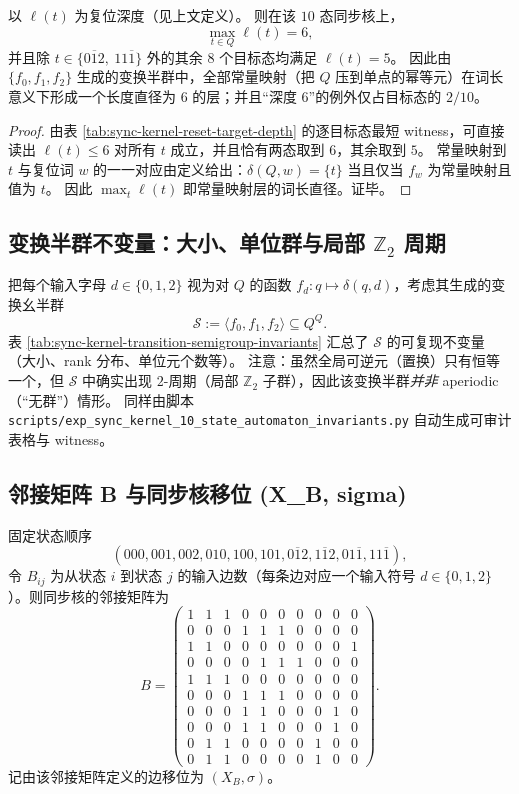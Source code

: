 

\begin{proposition}[复位深度谱的集中与常量映射理想的长度直径]\label{prop:sync10-reset-depth-diameter}
以 \(\ell(t)\) 为复位深度（见上文定义）。
则在该 \(10\) 态同步核上，
\[
\max_{t\in Q}\ell(t)=6,
\]
并且除 \(t\in\{0\overline{1}2,\ 11\overline{1}\}\) 外的其余 \(8\) 个目标态均满足 \(\ell(t)=5\)。
因此由 \(\{f_0,f_1,f_2\}\) 生成的变换半群中，全部常量映射（把 \(Q\) 压到单点的幂等元）在词长意义下形成一个长度直径为 \(6\) 的层；并且“深度 \(6\)”的例外仅占目标态的 \(2/10\)。
\end{proposition}
\begin{proof}
由表 \ref{tab:sync-kernel-reset-target-depth} 的逐目标态最短 witness，可直接读出 \(\ell(t)\le 6\) 对所有 \(t\) 成立，并且恰有两态取到 \(6\)，其余取到 \(5\)。
常量映射到 \(t\) 与复位词 \(w\) 的一一对应由定义给出：\(\delta(Q,w)=\{t\}\) 当且仅当 \(f_w\) 为常量映射且值为 \(t\)。
因此 \(\max_t\ell(t)\) 即常量映射层的词长直径。证毕。
\end{proof}

\subsection{变换半群不变量：大小、单位群与局部 \texorpdfstring{$\mathbb{Z}_2$}{Z2} 周期}\label{app:sync-kernel-semigroup}
把每个输入字母 $d\in\{0,1,2\}$ 视为对 $Q$ 的函数 $f_d:q\mapsto\delta(q,d)$，考虑其生成的变换幺半群
\[
\mathcal{S}:=\langle f_0,f_1,f_2\rangle\subseteq Q^Q.
\]
表 \ref{tab:sync-kernel-transition-semigroup-invariants} 汇总了 $\mathcal{S}$ 的可复现不变量（大小、rank 分布、单位元个数等）。
注意：虽然全局可逆元（置换）只有恒等一个，但 $\mathcal{S}$ 中确实出现 $2$-周期（局部 $\mathbb{Z}_2$ 子群），因此该变换半群\emph{并非} aperiodic（“无群”）情形。
同样由脚本 \texttt{scripts/exp\_sync\_kernel\_10\_state\_automaton\_invariants.py} 自动生成可审计表格与 witness。



\subsection{邻接矩阵 B 与同步核移位 (X\_B, sigma)}\label{app:sync-kernel-basic}
固定状态顺序
\[
(000,001,002,010,100,101,0\overline{1}2,1\overline{1}2,01\overline{1},11\overline{1}),
\]
令 $B_{ij}$ 为从状态 $i$ 到状态 $j$ 的输入边数（每条边对应一个输入符号 $d\in\{0,1,2\}$）。则同步核的邻接矩阵为
\[
B=
\begin{pmatrix}
1&1&1&0&0&0&0&0&0&0\\
0&0&0&1&1&1&0&0&0&0\\
1&1&0&0&0&0&0&0&0&1\\
0&0&0&0&1&1&1&0&0&0\\
1&1&1&0&0&0&0&0&0&0\\
0&0&0&1&1&1&0&0&0&0\\
0&0&0&1&1&0&0&0&1&0\\
0&0&0&1&1&0&0&0&1&0\\
0&1&1&0&0&0&0&1&0&0\\
0&1&1&0&0&0&0&1&0&0
\end{pmatrix}.
\]
记由该邻接矩阵定义的边移位为 $(X_B,\sigma)$。

